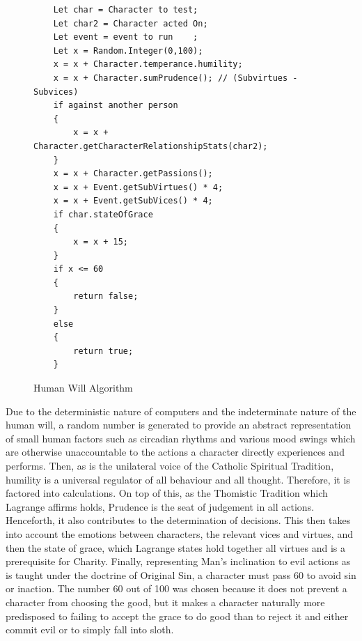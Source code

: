 \documentclass[11pt]{article}
\begin{document}
\pagebreak
\begin{figure}[h]
\begin{lstlisting}
	Let char = Character to test;
	Let char2 = Character acted On;
	Let event = event to run	;
	Let x = Random.Integer(0,100);
	x = x + Character.temperance.humility;
	x = x + Character.sumPrudence(); // (Subvirtues - Subvices) 
	if against another person
	{
		x = x + Character.getCharacterRelationshipStats(char2);
	}
	x = x + Character.getPassions();
	x = x + Event.getSubVirtues() * 4;
	x = x + Event.getSubVices() * 4;
	if char.stateOfGrace
	{
		x = x + 15;
	}
	if x <= 60
	{
		return false;
	}
	else
	{
		return true;
	}
\end{lstlisting}
\caption{Human Will Algorithm}
\end{figure}
Due to the deterministic nature of computers and the indeterminate nature of the human will, a random number is generated to provide an abstract representation of small human factors such as circadian rhythms and various mood swings which are otherwise unaccountable to the actions a character directly experiences and performs. Then, as is the unilateral voice of the Catholic Spiritual Tradition, humility is a universal regulator of all behaviour and all thought. Therefore, it is factored into calculations. On top of this, as the Thomistic Tradition which Lagrange affirms holds, Prudence is the seat of judgement in all actions. Henceforth, it also contributes to the determination of decisions. This then takes into account the emotions between characters, the relevant vices and virtues, and then the state of grace, which Lagrange states hold together all virtues and is a prerequisite for Charity. Finally, representing Man's inclination to evil actions as is taught under the doctrine of Original Sin, a character must pass 60 to avoid sin or inaction. The number 60 out of 100 was chosen because it does not prevent a character from choosing the good, but it makes a character naturally more predisposed to failing to accept the grace to do good than to reject it and either commit evil or to simply fall into sloth.\\
\end{document}

